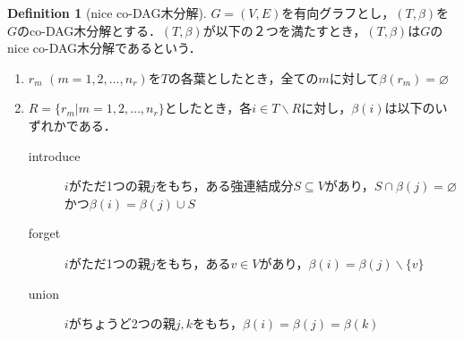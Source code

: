 \documentclass[master]{kuisthesis}		%
\theoremstyle{plain}
\theoremstyle{definition}
\newtheorem{definition*}{Definition}
\begin{document}
\begin{definition*}[nice co-DAG木分解]
 $G=(V, E)$を有向グラフとし，$(T, \beta)$を$G$のco-DAG木分解とする．$(T, \beta)$が以下の２つを満たすとき，$(T, \beta)$は$G$のnice co-DAG木分解であるという．
 
\begin{enumerate}
    \item $r_m$ $(m = 1, 2, \dots, n_r)$を$T$の各葉としたとき，全ての$m$に対して$\beta(r_m) = \varnothing$ 
    \item $R = \{r_m | m = 1, 2, \dots, n_r\}$としたとき，各$i \in T \backslash R$に対し，$\beta(i)$は以下のいずれかである．
    \begin{description}
          \item[introduce] $i$がただ1つの親$j$をもち，ある強連結成分$S\subseteq V$があり，$S \cap \beta(j) = \varnothing$かつ$\beta(i) = \beta(j) \cup S$
          \item[forget] $i$がただ1つの親$j$をもち，ある$v \in V$があり，$\beta(i) = \beta(j) \backslash \{v\}$
          \item[union] $i$がちょうど2つの親$j, k$をもち，$\beta(i) = \beta(j) = \beta(k)$
    \end{description}
    \end{enumerate}
\end{definition*}

\end{document}
